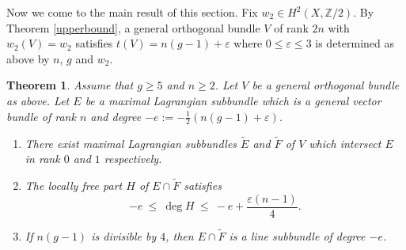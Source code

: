 \documentclass[10pt]{amsart}
\numberwithin{equation}{section}
\newcommand{\Z}{\mathbb Z}
\newtheorem{theorem}{{\textbf Theorem}}[section]
\begin{document}

Now we come to the main result of this section. Fix $w_2 \in H^2 (X, \Z / 2)$. By Theorem \ref{upperbound}, a general orthogonal bundle $V$ of rank $2n$ with $w_2(V) = w_2$ satisfies $t(V) = n(g-1) + \varepsilon$ where $0 \le \varepsilon \le 3$ is determined as above by $n$, $g$ and $w_2$.

\begin{theorem} \label{intersection} Assume that $g \ge 5$ and $n \ge 2$. Let $V$ be a general orthogonal bundle as above. Let $E$ be a maximal Lagrangian subbundle which is a general vector bundle of rank $n$ and degree $-e := -\frac{1}{2}(n(g-1) + \varepsilon)$.
\begin{enumerate}
\renewcommand{\labelenumi}{(\arabic{enumi})}
\item There exist maximal Lagrangian subbundles $\widetilde{E}$ and $\widetilde{F}$ of $V$ which intersect $E$ in rank $0$ and $1$ respectively.
\item The locally free part $H$ of $E \cap \widetilde{F}$ satisfies
\[ -e \ \le \ \deg H \ \le \ - e + \frac{\varepsilon(n-1)}{4}. \]
\item If $n(g-1)$ is divisible by $4$, then $E \cap \widetilde{F}$ is a line subbundle of degree $-e$.
\end{enumerate}
\end{theorem}
\end{document}
